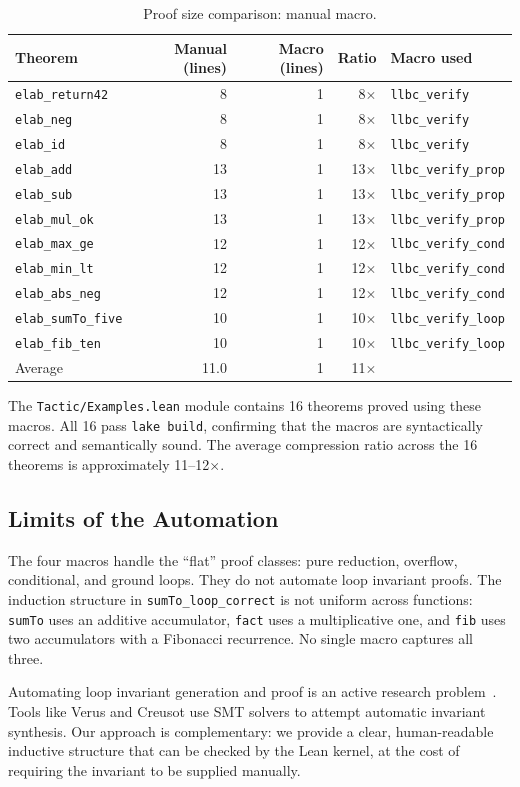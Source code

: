 \begin{table}[t]
\centering
\caption{Proof size comparison: manual \vs macro.}
\label{tab:compression}
\small
\begin{tabular}{@{}lrrrl@{}}
\toprule
\textbf{Theorem} & \textbf{Manual (lines)} & \textbf{Macro (lines)} & \textbf{Ratio} & \textbf{Macro used} \\
\midrule
\texttt{elab\_return42}   & 8  & 1 & 8$\times$  & \texttt{llbc\_verify} \\
\texttt{elab\_neg}        & 8  & 1 & 8$\times$  & \texttt{llbc\_verify} \\
\texttt{elab\_id}         & 8  & 1 & 8$\times$  & \texttt{llbc\_verify} \\
\texttt{elab\_add}        & 13 & 1 & 13$\times$ & \texttt{llbc\_verify\_prop} \\
\texttt{elab\_sub}        & 13 & 1 & 13$\times$ & \texttt{llbc\_verify\_prop} \\
\texttt{elab\_mul\_ok}    & 13 & 1 & 13$\times$ & \texttt{llbc\_verify\_prop} \\
\texttt{elab\_max\_ge}    & 12 & 1 & 12$\times$ & \texttt{llbc\_verify\_cond} \\
\texttt{elab\_min\_lt}    & 12 & 1 & 12$\times$ & \texttt{llbc\_verify\_cond} \\
\texttt{elab\_abs\_neg}   & 12 & 1 & 12$\times$ & \texttt{llbc\_verify\_cond} \\
\texttt{elab\_sumTo\_five}& 10 & 1 & 10$\times$ & \texttt{llbc\_verify\_loop} \\
\texttt{elab\_fib\_ten}   & 10 & 1 & 10$\times$ & \texttt{llbc\_verify\_loop} \\
\midrule
Average                    & 11.0 & 1 & 11$\times$ & \\
\bottomrule
\end{tabular}
\end{table}

The \texttt{Tactic/Examples.lean} module contains 16 theorems proved using
these macros. All 16 pass \texttt{lake build}, confirming that the macros
are syntactically correct and semantically sound. The average compression
ratio across the 16 theorems is approximately 11--12$\times$.

\subsection{Limits of the Automation}

The four macros handle the ``flat'' proof classes: pure reduction, overflow,
conditional, and ground loops. They do not automate loop invariant proofs.
The induction structure in \texttt{sumTo\_loop\_correct} is not uniform
across functions: \texttt{sumTo} uses an additive accumulator, \texttt{fact}
uses a multiplicative one, and \texttt{fib} uses two accumulators with a
Fibonacci recurrence. No single macro captures all three.

Automating loop invariant generation and proof is an active research
problem~\cite{verus2023,creusot2022}. Tools like Verus and Creusot use SMT
solvers to attempt automatic invariant synthesis. Our approach is complementary:
we provide a clear, human-readable inductive structure that can be checked by
the Lean kernel, at the cost of requiring the invariant to be supplied
manually.
